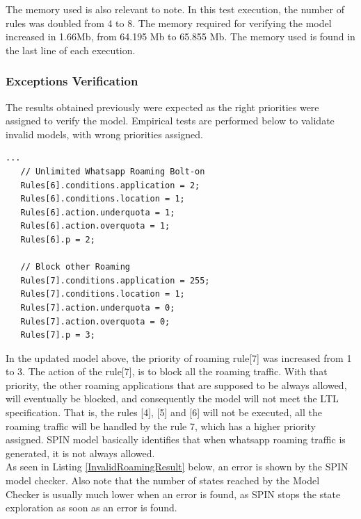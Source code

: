 The memory used is also relevant to note. In this test execution, the number of rules was doubled from 4 to 8. The memory required for verifying the model increased in 1.66Mb, from 64.195 Mb to 65.855 Mb. The memory used is found in the last line of each execution.

\subsubsection{Exceptions Verification}
\noindent The results obtained previously were expected as the right priorities were assigned to verify the model. Empirical tests are performed below to validate invalid models, with wrong priorities assigned. 

\singlespacing
\begin{lstlisting}[caption=Increased priority of the Roaming Rule,
  label=RoamingRules_wrong]
   ...
   // Unlimited Whatsapp Roaming Bolt-on
   Rules[6].conditions.application = 2;
   Rules[6].conditions.location = 1;
   Rules[6].action.underquota = 1;
   Rules[6].action.overquota = 1;
   Rules[6].p = 2;
   
   // Block other Roaming
   Rules[7].conditions.application = 255;
   Rules[7].conditions.location = 1;
   Rules[7].action.underquota = 0;
   Rules[7].action.overquota = 0;
   Rules[7].p = 3;

\end{lstlisting}
\doublespacing \bigskip

In the updated model above, the priority of roaming rule[7] was increased from 1 to 3. The action of the rule[7], is to block all the roaming traffic. With that priority, the other roaming applications that are supposed to be always allowed, will eventually be blocked, and consequently the model will not meet the LTL specification. That is, the rules [4], [5] and [6] will not be executed, all the roaming traffic will be handled by the rule 7, which has a higher priority assigned. SPIN model basically identifies that when whatsapp roaming traffic is generated, it is not always allowed. \\

As seen in Listing \ref{InvalidRoamingResult} below, an error is shown by the SPIN model checker. Also note that the number of states reached by the Model Checker is usually much lower when an error is found, as SPIN stops the state exploration as soon as an error is found. \\

